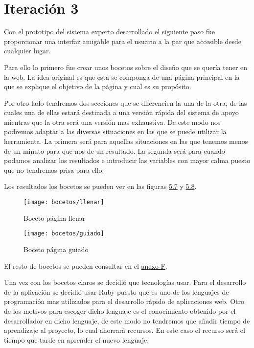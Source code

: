 \section{Iteración 3}


Con el prototipo del sistema experto desarrollado el siguiente paso fue
proporcionar una interfaz amigable para el usuario a la par que accesible
desde cualquier lugar.

Para ello lo primero fue crear unos bocetos sobre el diseño que se quería tener
en la web. La idea original es que esta se componga de una página
principal en la que se explique el objetivo de la página y cual es su propósito.

Por otro lado tendremos dos secciones que se diferencien la una de la otra, de las
cuales una de ellas estará destinada a una versión rápida del sistema de apoyo mientras
que la otra será una versión mas exhaustiva. De este modo nos podremos adaptar
a las diversas situaciones en las que se puede utilizar la herramienta.
La primera será para aquellas situaciones en las que tenemos menos de un minuto
para que nos de un resultado. La segunda será para cuando podamos analizar
los resultados e introducir las variables con mayor calma puesto que no
tendremos prisa para ello.

Los resultados los bocetos se pueden ver en las figuras \hyperref[fig:Boceto página llenar]{5.7} y \hyperref[fig:Boceto página guiado]{5.8}.

\begin{figure}[htb]
  \centering
    \texttt{[image: bocetos/llenar]}
  \caption[Boceto página llenar]{Boceto página llenar}
  \label{fig:Boceto página llenar}
\end{figure}

\begin{figure}[htb]
  \centering
    \texttt{[image: bocetos/guiado]}
  \caption[Boceto página guiado]{Boceto página guiado}
  \label{fig:Boceto página guiado}
\end{figure}

El resto de bocetos se pueden consultar en el \hyperref[cap:Bocetos]{anexo F}.

Una vez con los bocetos claros se decidió que tecnologías usar. Para el desarrollo
de la aplicación se decidió usar Ruby puesto que es uno de los lenguajes
de programación mas utilizados para el desarrollo rápido de aplicaciones web.
Otro de los motivos para escoger dicho lenguaje es el conocimiento obtenido
por el desarrollador en dicho lenguaje, de este modo no tendremos que añadir
tiempo de aprendizaje al proyecto, lo cual ahorrará recursos. En este caso el
recurso será el tiempo que tarde en aprender el nuevo lenguaje.

